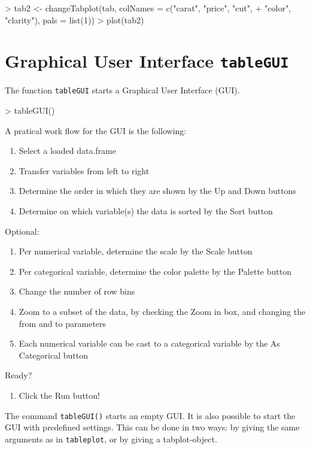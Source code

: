 \documentclass[11pt, fleqn, a4paper]{article}
\newenvironment{myindentpar}[1]%
{\begin{list}{}%
         {\setlength{\leftmargin}{#1}}%
         \item[]%
}
{\end{list}}
\begin{document}
\begin{Schunk}
\begin{Sinput}
> tab2 <- changeTabplot(tab, colNames = c("carat", "price", "cut", 
+     "color", "clarity"), pals = list(1))
> plot(tab2)
\end{Sinput}
\end{Schunk}



\section{Graphical User Interface {\tt tableGUI}}
The function {\tt tableGUI} starts a Graphical User Interface (GUI).
\begin{Schunk}
\begin{Sinput}
> tableGUI()
\end{Sinput}
\end{Schunk}
A pratical work flow for the GUI is the following:
\begin{myindentpar}{1cm}
{\footnotesize
\begin{enumerate}
\item Select a loaded data.frame
\item Transfer variables from left to right
\item Determine the order in which they are shown by the Up and Down buttons
\item Determine on which variable(s) the data is sorted by the Sort button
\end{enumerate}
Optional:
\begin{enumerate}[resume]
\item Per numerical variable, determine the scale by the Scale button
\item Per categorical variable, determine the color palette by the Palette button
\item Change the number of row bins 
\item Zoom to a subset of the data, by checking the Zoom in box, and changing the from and to parameters
\item Each numerical variable can be cast to a categorical variable by the As Categorical button
\end{enumerate}
Ready?
\begin{enumerate}[resume]
\item Click the Run button!
\end{enumerate}
}
\end{myindentpar}

The command {\tt tableGUI()} starts an empty GUI. It is also possible to start the GUI with predefined settings. This can be done in two ways: by giving the same arguments as in {\tt tableplot}, or by giving a tabplot-object.
\end{document}
